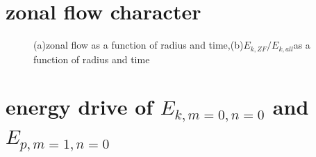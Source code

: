\documentclass[11pt,a4paper]{article}
\begin{document}
\section{zonal flow character}
	\begin{figure}[H]
		\centering
		\caption{(a)zonal flow as a function of radius and time,(b)$E_{k,ZF}/E_{k,all}$as a function of radius and time}
	\end{figure}

\section{energy drive of $E_{k,m=0,n=0}$ and $E_{p,m=1,n=0}$}
\end{document}
